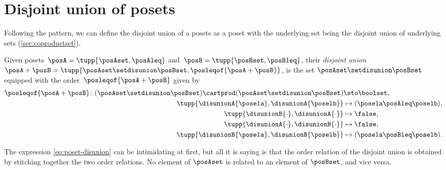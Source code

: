 
\section{Disjoint union of posets}

Following the pattern, we can define the disjoint union of a posets as a poset with the underlying set being the disjoint union of underlying sets (\cref{sec:coproductset}).

\begin{definition}
    Given posets~$\posA=\tupp{\posAset, \posAleq}$ and~$\posB=\tupp{\posBset, \posBleq}$, their \emph{disjoint union}~$\posA+\posB=\tupp{\posAset \setdisunion \posBset, \posleqof{\posA + \posB}}$, is the set $\posAset \setdisunion \posBset$ equipped with the order~$\posleqof{\posA + \posB}$ given by
    \begin{equation} \label{eq:poset-disunion}
        \begin{aligned}
            \posleqof{\posA+\posB}\colon
            (\posAset\setdisunion\posBset)\cartprod (\posAset
            \setdisunion\posBset)                           & \sto \boolset, \\
            \tupp{\disunionA{\posela},\disunionA{\poselb} } &
            \mapsto (\posela\posAleq \poselb), \\
            \tupp{\disunionB{\cdot},\disunionA{\cdot} }     &
            \mapsto \false, \\
            \tupp{\disunionA{\cdot},\disunionB{\cdot}}      &
            \mapsto \false, \\
            \tupp{\disunionB{\posela},\disunionB{\poselb}}  &
            \mapsto (\posela\posBleq \poselb).
        \end{aligned}
    \end{equation}
\end{definition}

The expression \cref{eq:poset-disunion} can be intimidating at first, but all it is saying is that the order relation of the disjoint union is obtained by stitching together the two order relations. No element of $\posAset$ is related to an element of $\posBset$, and vice versa.

